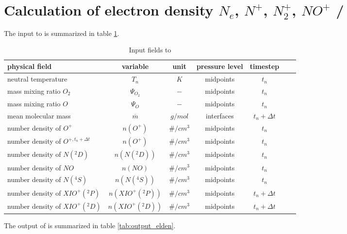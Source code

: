 %
\section{Calculation of electron density $N_e$, $N^+$, $N_2^+$, $NO^+$ / }\label{cap:elden}
%
The input to  is summarized in table
\ref{tab:input_elden}.
%
\begin{table}[tb]
\begin{tabular}{|p{3.5cm} ||c|c|c|c|c|c|} \hline
physical field               & variable        & unit&pressure
level& timestep
\\ \hline \hline
%
neutral temperature &       $T_n$              & $K$   &  midpoints & $t_n$\\
mass mixing ratio $O_2$&       {$\Psi_{O_2}$}     & $-$   & midpoints  & $t_n$\\
mass mixing ratio $O$&       {$\Psi_{O}$}     & $-$   &  midpoints & $t_n$\\
mean molecular mass&       {$\overline{m}$}     & $g/mol$   & interfaces  &$t_n + \Delta t$ \\
number density of $O^+$&   $n(O^+)$         & $\#/cm^3$   & midpoints  &$t_n $ \\
number density of $O^{+,t_n+\Delta t}$&   $n(O^+)$         & $\#/cm^3$   & midpoints  &$t_n $ \\
number density of $N(^2D)$&   $n(N(^2D))$  & $\#/cm^3$   & midpoints  &$t_n$ \\
number density of $NO$&   $n(NO)$  & $\#/cm^3$   & midpoints  &$t_n$ \\
number density of $N(^4S)$&   $n(N(^4S))$  & $\#/cm^3$   & midpoints  &$t_n$ \\
number density of $XI O^+(^2P)$&   $n(XI O^+(^2P))$  & $\#/cm^3$   & midpoints  &$t_n+ \Delta t$ \\
number density of $XI O^+(^2D)$&   $n(XI O^+(^2D))$  & $\#/cm^3$   &
midpoints &$t_n+ \Delta t$
 \\ \hline
\end{tabular}
\caption{Input fields to }
\label{tab:input_elden}
\end{table}
%
The output of  is summarized in table
\ref{tab:output_elden}.
%
